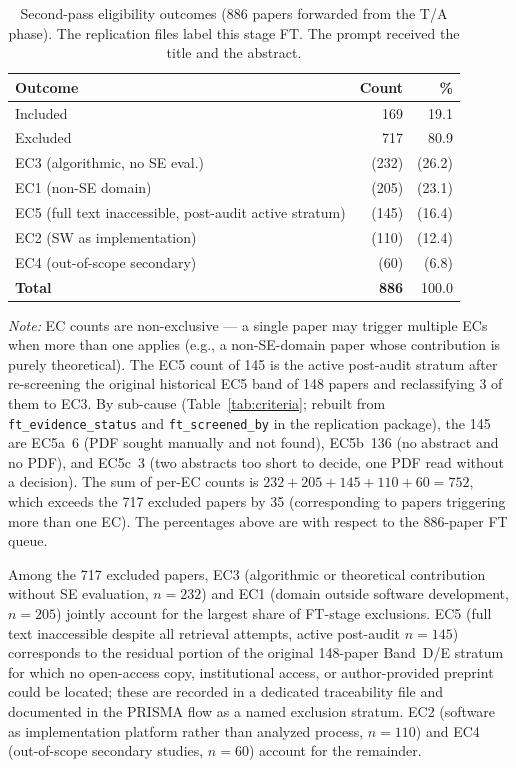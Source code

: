 \begin{table}[htbp]
\centering
\caption{Second-pass eligibility outcomes (886 papers forwarded from the T/A phase). The replication files label this stage FT. The prompt received the title and the abstract.}
\label{tab:ft-screening}
\small
\setlength{\tabcolsep}{4pt}
\begin{tabular}{lrr}
\toprule
\textbf{Outcome} & \textbf{Count} & \textbf{\%} \\
\midrule
Included                             & 169 & 19.1 \\
Excluded                             & 717 & 80.9 \\
\quad EC3 (algorithmic, no SE eval.) & (232) & (26.2) \\
\quad EC1 (non-SE domain)            & (205) & (23.1) \\
\quad EC5 (full text inaccessible, post-audit active stratum)   & (145) & (16.4) \\
\quad EC2 (SW as implementation)     & (110) & (12.4) \\
\quad EC4 (out-of-scope secondary)   & (60)  & (6.8)  \\
\midrule
\textbf{Total} & \textbf{886} & 100.0 \\
\bottomrule
\end{tabular}

\smallskip
\footnotesize\textit{Note:} EC counts are non-exclusive --- a single paper may
trigger multiple ECs when more than one applies (e.g., a non-SE-domain paper
whose contribution is purely theoretical). The EC5 count of 145 is the active
post-audit stratum after re-screening the original historical EC5 band of 148
papers and reclassifying 3 of them to EC3. By sub-cause
(Table~\ref{tab:criteria}; rebuilt from \texttt{ft\_evidence\_status}
and \texttt{ft\_screened\_by} in the replication package), the 145 are
EC5a~6 (PDF sought manually and not found), EC5b~136 (no abstract and no
PDF), and EC5c~3 (two abstracts too short to decide, one PDF read without
a decision). The sum of per-EC counts is
$232+205+145+110+60 = 752$, which exceeds the 717 excluded papers by 35
(corresponding to papers triggering more than one EC). The percentages above
are with respect to the 886-paper FT queue.
\end{table}

Among the 717 excluded papers, EC3 (algorithmic or theoretical contribution
without SE evaluation, $n=232$) and EC1 (domain outside software development,
$n=205$) jointly account for the largest share of FT-stage exclusions. EC5
(full text inaccessible despite all retrieval attempts, active post-audit
$n=145$) corresponds to the residual portion of the original 148-paper
Band~D/E stratum for which no open-access copy, institutional access, or
author-provided preprint could be located; these are recorded in a dedicated
traceability file and documented in the PRISMA flow as a named exclusion
stratum. EC2 (software as implementation platform rather than
analyzed process, $n=110$) and EC4 (out-of-scope secondary studies, $n=60$)
account for the remainder.

